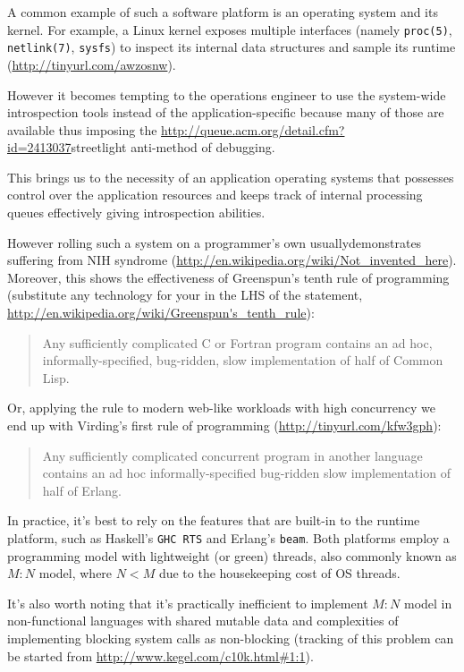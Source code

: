 \documentclass[10pt, a5paper]{article}
\begin{document}
A common example of such a software platform is an operating system and its kernel. For example, a Linux kernel exposes multiple interfaces (namely {\tt proc(5)}, {\tt netlink(7)}, {\tt sysfs}) to inspect its internal data structures and sample its runtime (\url{http://tinyurl.com/awzosnw}).

However it becomes tempting to the operations engineer to use the system-wide introspection tools instead of the application-specific because many of those are available thus imposing the \url{http://queue.acm.org/detail.cfm?id=2413037}{streetlight anti-method} of debugging.

This brings us to the necessity of an application operating systems that possesses control over the application resources and keeps track of internal processing queues effectively giving introspection abilities.

However rolling such a system on a programmer's own usually\linebreak demonstrates suffering from {NIH}  syndrome (\url{http://en.wikipedia.org/wiki/Not_invented_here}). Moreover, this shows the effectiveness of {Greenspun}'s tenth rule of programming (substitute any technology for your in the LHS of the statement, \url{http://en.wikipedia.org/wiki/Greenspun's_tenth_rule}):

\begin{quote}%
Any sufficiently complicated C or Fortran program contains an ad hoc, informally-specified, bug-ridden, slow implementation of half of Common Lisp.
\end{quote}
Or, applying the rule to modern web-like workloads with high \linebreak concurrency we end up with {Virding}'{}s first rule of programming (\url{http://tinyurl.com/kfw3gph}):

\begin{quote}%
Any sufficiently complicated concurrent program in another language contains an ad hoc informally-specified bug-ridden slow implementation of half of Erlang.

\end{quote}
In practice, it's best to rely on the features that are built-in to the runtime platform, such as Haskell's {\tt GHC RTS} and Erlang's {\tt beam}. Both platforms employ a programming model with lightweight (or green) threads, also commonly known as $ M:N $ model, where $ N < M $ due to the housekeeping cost of OS threads.

It's also worth noting that it's practically inefficient to implement $ M:N $ model in non-functional languages with shared mutable data and complexities of implementing blocking system calls as non-blocking (tracking of this problem can be started from \url{http://www.kegel.com/c10k.html#1:1}).
\end{document}
